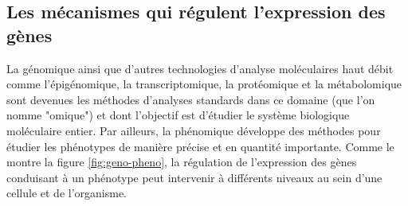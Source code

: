 \subsection{Les mécanismes qui régulent l'expression des gènes}
La génomique ainsi que d'autres technologies d'analyse moléculaires haut débit comme l'épigénomique, la transcriptomique, la protéomique et la métabolomique sont devenues les méthodes d'analyses standards dans ce domaine (que l'on nomme "omique") et dont l'objectif est d'étudier le système biologique moléculaire entier. Par ailleurs, la phénomique développe des méthodes pour étudier les phénotypes de manière précise et en quantité importante. Comme le montre la figure \ref{fig:geno-pheno}, la régulation de l'expression des gènes conduisant à un phénotype peut intervenir à différents niveaux au sein d'une cellule et de l'organisme. \\
